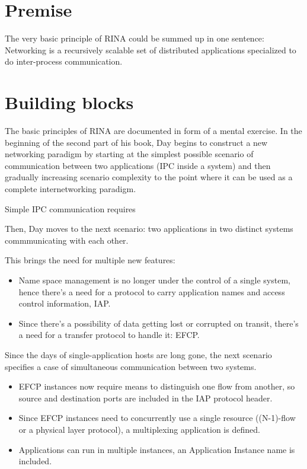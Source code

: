     \section{Premise}
        The very basic principle of RINA could be summed up in one sentence: Networking is a recursively scalable set of distributed applications specialized to do inter-process communication.

    \section{Building blocks}
        The basic principles of RINA are documented in form of a mental exercise. In the beginning of the second part of his book, Day begins to construct a new networking paradigm by starting at the simplest possible scenario of communication between two applications (IPC inside a system) and then gradually increasing scenario complexity to the point where it can be used as a complete internetworking paradigm.

        \vspace{300pt}
        Simple IPC communication requires

        Then, Day moves to the next scenario: two applications in two distinct systems commmunicating with each other.

        This brings the need for multiple new features:

        \begin{itemize}
        \item Name space management is no longer under the control of a single system, hence there's a need for a protocol to carry application names and access control information, IAP.
        \item Since there's a possibility of data getting lost or corrupted on transit, there's a need for a transfer protocol to handle it: EFCP.
        \end{itemize}

        Since the days of single-application hosts are long gone, the next scenario specifies a case of simultaneous communication between two systems.
        \vspace{300pt}
        \begin{itemize}
        \item EFCP instances now require means to distinguish one flow from another, so source and destination ports are included in the IAP protocol header.
        \item Since EFCP instances need to concurrently use a single resource ((N-1)-flow or a physical layer protocol), a multiplexing application is defined.
        \item Applications can run in multiple instances, an Application Instance name is included.
        \end{itemize}

